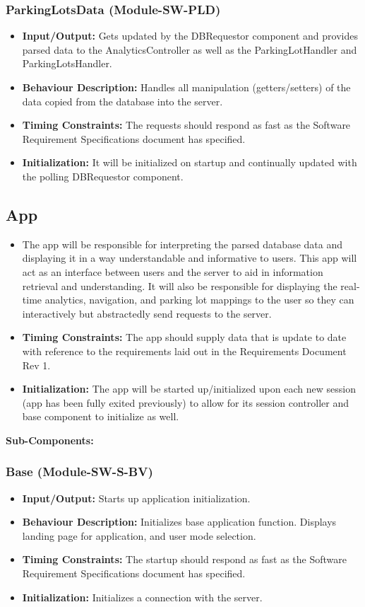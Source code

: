 \documentclass[]{article}
\begin{document}
	\subsubsection{ParkingLotsData (Module-SW-PLD)}
	\begin{itemize}
		\item \textbf{Input/Output:} Gets updated by the DBRequestor component and provides parsed data to the AnalyticsController as well as the ParkingLotHandler and ParkingLotsHandler.
		\item \textbf{Behaviour Description:} Handles all manipulation (getters/setters) of the data copied from the database into the server.
		\item \textbf{Timing Constraints:} The requests should respond as fast as the Software Requirement Specifications document has specified.
		\item \textbf{Initialization:} It will be initialized on startup and continually updated with the polling DBRequestor component.
	\end{itemize}
	
	
	\subsection{App}
	\begin{itemize}
		\item The app will be responsible for interpreting the parsed database data and displaying it in a way understandable and informative to users. This app will act as an interface between users and the server to aid in information retrieval and understanding. It will also be responsible for displaying the real-time analytics, navigation, and parking lot mappings to the user so they can interactively but abstractedly send requests to the server.
		\item \textbf{Timing Constraints:} The app should supply data that is update to date with reference to the requirements laid out in the Requirements Document Rev 1.
		\item \textbf{Initialization:} The app will be started up/initialized upon each new session (app has been fully exited previously) to allow for its session controller and base component to initialize as well.
	\end{itemize}
	\textbf{Sub-Components:}
	
	\subsubsection{Base (Module-SW-S-BV)}
	\begin{itemize}
		\item \textbf{Input/Output:} Starts up application initialization.
		\item \textbf{Behaviour Description:} Initializes base application function. Displays landing page for application, and user mode selection.
		\item \textbf{Timing Constraints:} The startup should respond as fast as the Software Requirement Specifications document has specified.
		\item \textbf{Initialization:} Initializes a connection with the server.
	\end{itemize}
	
\end{document}
